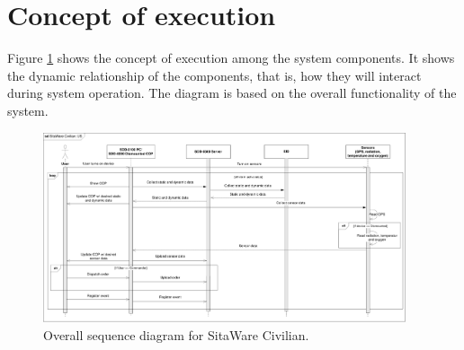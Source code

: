\section{Concept of execution}

Figure \ref{fig:sekvens1} shows the concept of execution among the system components. It shows the dynamic relationship of the components, that is, how they will interact during system operation. The diagram is based on the overall functionality of the system. 


\begin{figure}[H]
\centering
\includegraphics[width=0.95\textwidth]
{billeder/sekvens1.pdf}
\caption{Overall sequence diagram for SitaWare Civilian.}
\label{fig:sekvens1}
\end{figure}